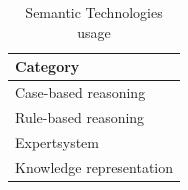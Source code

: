         
            \begin{table}[h]
                \centering
        	    {
        	    \begin{tabular}{ | m{14.5cm} | }
                    \hline
                    \rowcolor{teal!30} Category \\
                    
                    \hline
                    Case-based reasoning\\
                    
                    \hline
                    Rule-based reasoning\\
                    
                    \hline
                    Expertsystem\\
                    
                    \hline
                    Knowledge representation\\
                    
                    \hline
                \end{tabular}}
                \caption{\label{tab:sem-tec-usage} Semantic Technologies usage}
            \end{table}

